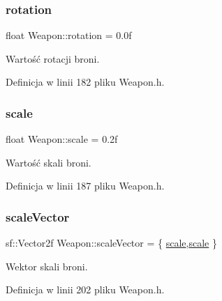 \mbox{\label{class_weapon_aea591386a659ecf7dd7e41ada97db990}} 
\subsubsection{\texorpdfstring{rotation}{rotation}}
{\footnotesize\ttfamily float Weapon\+::rotation = 0.\+0f\hspace{0.3cm}{\ttfamily [protected]}}



Wartość rotacji broni. 



Definicja w linii 182 pliku Weapon.\+h.

\mbox{\label{class_weapon_a425a9f9fc4bb9bf0e4de80855d3e2ac0}} 
\subsubsection{\texorpdfstring{scale}{scale}}
{\footnotesize\ttfamily float Weapon\+::scale = 0.\+2f\hspace{0.3cm}{\ttfamily [protected]}}



Wartość skali broni. 



Definicja w linii 187 pliku Weapon.\+h.

\mbox{\label{class_weapon_a8783dd00b0d4281cf384f58db5f488b1}} 
\subsubsection{\texorpdfstring{scale\+Vector}{scaleVector}}
{\footnotesize\ttfamily sf\+::\+Vector2f Weapon\+::scale\+Vector = \{ \mbox{\hyperlink{class_weapon_a425a9f9fc4bb9bf0e4de80855d3e2ac0}{scale}},\mbox{\hyperlink{class_weapon_a425a9f9fc4bb9bf0e4de80855d3e2ac0}{scale}} \}\hspace{0.3cm}{\ttfamily [protected]}}



Wektor skali broni. 



Definicja w linii 202 pliku Weapon.\+h.

